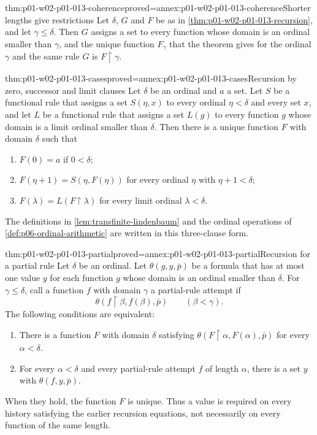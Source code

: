 \begin{hbcorollary}{thm:p01-w02-p01-013-coherence}{proved=annex:p01-w02-p01-013-coherence}{Shorter lengths give restrictions}
Let \(\delta\), \(G\) and \(F\) be as in
\cref{thm:p01-w02-p01-013-recursion}, and let \(\gamma\leq\delta\). Then
\(G\) assigns a set to every function whose domain is an ordinal smaller than
\(\gamma\), and the unique function \(F_\gamma\) that the theorem gives for
the ordinal \(\gamma\) and the same rule \(G\) is
\(F\mathbin{\upharpoonright}\gamma\).
\end{hbcorollary}

\begin{hbcorollary}{thm:p01-w02-p01-013-cases}{proved=annex:p01-w02-p01-013-cases}{Recursion by zero, successor and limit clauses}
Let \(\delta\) be an ordinal and \(a\) a set. Let \(S\) be a functional rule
that assigns a set \(S(\eta,x)\) to every ordinal \(\eta<\delta\) and every
set \(x\), and let \(L\) be a functional rule that assigns a set \(L(g)\) to
every function \(g\) whose domain is a limit ordinal smaller than \(\delta\).
Then there is a unique function \(F\) with domain \(\delta\) such that
\begin{enumerate}
  \item \(F(0)=a\) if \(0<\delta\);
  \item \(F(\eta+1)=S(\eta,F(\eta))\) for every ordinal \(\eta\) with
        \(\eta+1<\delta\);
  \item \(F(\lambda)=L(F\mathbin{\upharpoonright}\lambda)\) for every limit
        ordinal \(\lambda<\delta\).
\end{enumerate}
\end{hbcorollary}

The definitions in \cref{lem:transfinite-lindenbaum} and the ordinal
operations of \cref{def:p06-ordinal-arithmetic} are written in this
three-clause form.

\begin{hbcorollary}{thm:p01-w02-p01-013-partial}{proved=annex:p01-w02-p01-013-partial}{Recursion for a partial rule}
Let \(\delta\) be an ordinal. Let \(\theta(g,y,\bar p)\) be a formula that
has at most one value \(y\) for each function \(g\) whose domain is an
ordinal smaller than \(\delta\). For \(\gamma\leq\delta\), call a function
\(f\) with domain \(\gamma\) a partial-rule attempt if
\[
 \theta(f\mathbin{\upharpoonright}\beta,f(\beta),\bar p)
 \qquad(\beta<\gamma).
\]
The following conditions are equivalent:
\begin{enumerate}
 \item There is a function \(F\) with domain \(\delta\) satisfying
       \(\theta(F\mathbin{\upharpoonright}\alpha,F(\alpha),\bar p)\)
       for every \(\alpha<\delta\).
 \item For every \(\alpha<\delta\) and every partial-rule attempt \(f\)
       of length \(\alpha\), there is a set \(y\) with
       \(\theta(f,y,\bar p)\).
\end{enumerate}
When they hold, the function \(F\) is unique. Thus a value is required on
every history satisfying the earlier recursion equations, not necessarily
on every function of the same length.
\end{hbcorollary}


